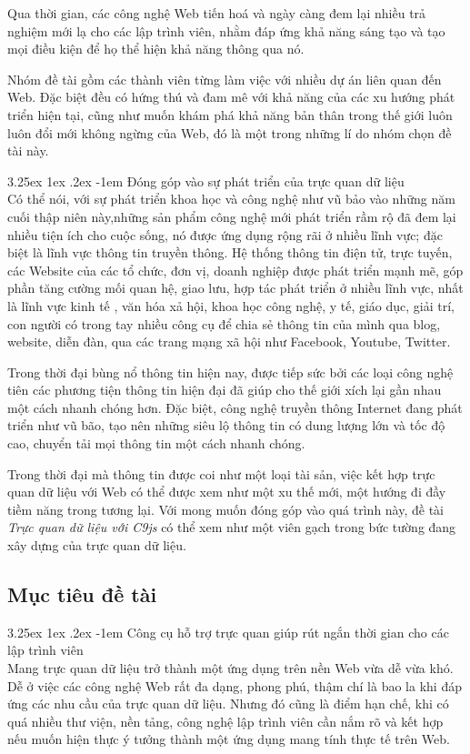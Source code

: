 \documentclass[12pt,a4paper]{article}
\makeatletter
\newcommand{\myparagraph}[1]{\paragraph{#1}\mbox{}\\} %
\renewcommand\paragraph{\@startsection{paragraph}{5}{\z@}%
  {3.25ex \@plus1ex \@minus.2ex}%
  {-1em}%
  {\normalfont\normalsize\bfseries}}
\makeatother
\begin{document}
Qua thời gian, các công nghệ Web tiến hoá và ngày càng đem lại nhiều trả nghiệm mới lạ cho các lập trình viên, nhằm đáp ứng khả năng sáng tạo và tạo mọi điều kiện để họ thể hiện khả năng thông qua nó. 

Nhóm đề tài gồm các thành viên từng làm việc với nhiều dự án liên quan đến Web. Đặc biệt đều có hứng thú và đam mê với khả năng của các xu hướng phát triển hiện tại, cũng như muốn khám phá khả năng bản thân trong thế giới luôn luôn đổi mới không ngừng của Web, đó là một trong những lí do nhóm chọn đề tài này.

\myparagraph{Đóng góp vào sự phát triển của trực quan dữ liệu}
\cite{technology_boom} Có thể nói, với sự phát triển khoa học và công nghệ như vũ bảo vào những năm cuối thập niên này,những sản phẩm công nghệ  mới phát triển rầm rộ đã đem lại nhiều tiện ích cho cuộc sống, nó được ứng dụng rộng rãi ở nhiều lĩnh vực; đặc biệt là lĩnh vực thông tin truyền thông. Hệ thống thông tin điện tử, trực tuyến, các Website của các tổ chức, đơn vị, doanh nghiệp được phát triển mạnh mẽ, góp phần tăng cường mối quan hệ, giao lưu, hợp tác phát triển ở nhiều lĩnh vực, nhất là lĩnh vực kinh tế , văn hóa xả hội, khoa học công nghệ, y tế, giáo dục, giải trí, con người có trong tay nhiều công cụ để chia sẻ thông tin của mình qua blog, website, diễn đàn, qua  các trang mạng xã hội như Facebook, Youtube, Twitter.

Trong thời đại bùng nổ thông tin hiện nay, được tiếp sức bởi các loại công nghệ tiên các phương tiện thông tin hiện đại đã giúp cho thế giới xích lại gần nhau một cách nhanh chóng hơn. Đặc biệt, công nghệ truyền thông Internet đang phát triển như vũ bão, tạo nên những siêu lộ thông tin có dung lượng lớn và tốc độ cao, chuyển tải mọi thông tin một cách nhanh chóng.

Trong thời đại mà thông tin được coi như một loại tài sản, việc kết hợp trực quan dữ liệu với Web có thể được xem như một xu thế mới, một hướng đi đầy tiềm năng trong tương lại. Với mong muốn đóng góp vào quá trình này, đề tài \textit{Trực quan dữ liệu với C9js} có thể xem như một viên gạch trong bức tường đang xây dựng của trực quan dữ liệu.
\subsection{Mục tiêu đề tài}
\myparagraph{Công cụ hỗ trợ trực quan giúp rút ngắn thời gian cho các lập trình viên}
Mang trực quan dữ liệu trở thành một ứng dụng trên nền Web vừa dễ vừa khó. Dễ ở việc các công nghệ Web rất đa dạng, phong phú, thậm chí là bao la khi đáp ứng các nhu cầu của trực quan dữ liệu. Nhưng đó cũng là điểm hạn chế, khi có quá nhiều thư viện, nền tảng, công nghệ lập trình viên cần nắm rõ và kết hợp nếu muốn hiện thực ý tưởng thành một ứng dụng mang tính thực tế trên Web.
\end{document}
